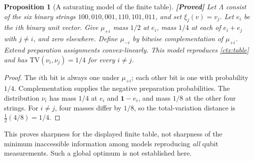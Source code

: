 \documentclass[11pt,a4paper]{article}
\newtheorem{proposition}[theorem]{Proposition}
\theoremstyle{definition}
\theoremstyle{remark}\newtheorem{remark}[theorem]{Remark}
\newcommand{\status}[1]{\textbf{[#1]}\quad}
\newcommand{\TV}{\mathrm{TV}}
\begin{document}
\begin{proposition}[A saturating model of the finite table]\label{ctx:saturation}
\status{Proved}
Let $\Lambda$ consist of the six binary strings $100,010,001,110,101,011$,
and set $\xi_j(v)=v_j$. Let $e_i$ be the $i$th binary unit vector.
Give $\mu_{+i}$ mass $1/2$ at $e_i$, mass $1/4$ at each of
$e_i+e_j$ with $j\ne i$, and zero elsewhere. Define $\mu_{-i}$ by
bitwise complementation of $\mu_{+i}$. Extend preparation assignments
convex-linearly. This model reproduces \eqref{ctx:table} and has
$\TV(\nu_i,\nu_j)=1/4$ for every $i\ne j$.
\end{proposition}

\begin{proof}
The $i$th bit is always one under $\mu_{+i}$; each other bit is one
with probability $1/4$. Complementation supplies the negative preparation
probabilities. The distribution $\nu_i$ has mass $1/4$ at $e_i$ and
$\mathbf1-e_i$, and mass $1/8$ at the other four strings. For $i\ne j$,
four masses differ by $1/8$, so the total-variation distance is
$\frac12(4/8)=1/4$.
\end{proof}

This proves sharpness for the displayed finite table, not sharpness of the
minimum inaccessible information among models reproducing \emph{all}
qubit measurements. Such a global optimum is not established here.
\end{document}
